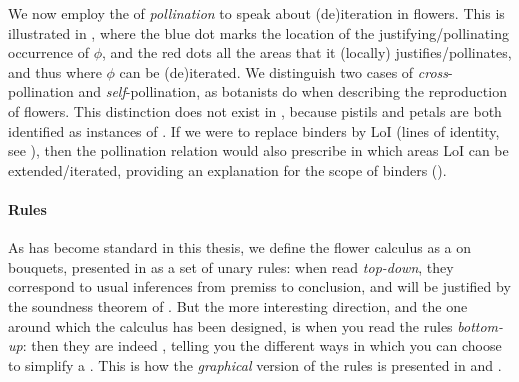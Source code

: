 \begin{scope}
We now employ the  of \emph{pollination} to speak about (de)iteration in
flowers. This is illustrated in , where the blue dot marks
the location of the justifying/pollinating occurrence of $\phi$, and the red
dots all the areas that it (locally) justifies/pollinates, and thus where $\phi$
can be (de)iterated. We distinguish two cases of
\emph{cross}-pollination and \emph{self}-pollination, as botanists do when
describing the reproduction of flowers. This distinction does not exist in
 , because pistils and petals are both identified as
instances of . If we were to replace
binders by LoI (lines of identity, see ), then the pollination
relation would also prescribe in which areas LoI can be extended/iterated,
providing an explanation for the scope of binders ().

\paragraph{Rules}

As has become standard in this thesis, we define the flower calculus as a
\emph{} on bouquets, presented in  as a
set of unary  rules: when read \emph{top-down}, they correspond to
usual inferences from premiss to conclusion, and will be justified by the
soundness theorem of .
But the more interesting direction, and the one around which the calculus has
been designed, is when you read the rules \emph{bottom-up}: then they are indeed
, telling you the different ways in which you can choose to
simplify a . This is how the \emph{graphical} version of the rules is
presented in  and .


\end{scope}
